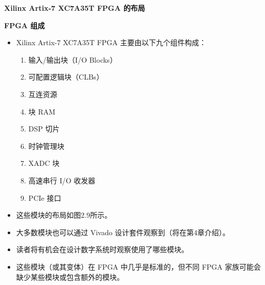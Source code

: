 \documentclass[
  ignorenonframetext,
  chinese,
]{beamer}
\providecommand{\tightlist}{%
  \setlength{\itemsep}{0pt}\setlength{\parskip}{0pt}}
\begin{document}
\begin{frame}
\begin{block}{\textbf{Xilinx Artix-7 XC7A35T FPGA 的布局}}
\label{xilinx-artix-7-xc7a35t-fpga-ux7684ux5e03ux5c40}
\begin{block}{\textbf{FPGA 组成}}
\label{fpga-ux7ec4ux6210}
\begin{itemize}
\tightlist
\item
  Xilinx Artix-7 XC7A35T FPGA 主要由以下九个组件构成：

  \begin{enumerate}
  \tightlist
  \item
    输入/输出块（I/O Blocks）
  \item
    可配置逻辑块（CLBs）
  \item
    互连资源
  \item
    块 RAM
  \item
    DSP 切片
  \item
    时钟管理块
  \item
    XADC 块
  \item
    高速串行 I/O 收发器
  \item
    PCIe 接口
  \end{enumerate}
\item
  这些模块的布局如图2.9所示。
\item
  大多数模块也可以通过 Vivado 设计套件观察到（将在第4章介绍）。
\item
  读者将有机会在设计数字系统时观察使用了哪些模块。
\item
  这些模块（或其变体）在 FPGA 中几乎是标准的，但不同 FPGA
  家族可能会缺少某些模块或包含额外的模块。
\end{itemize}


\end{block}
\end{block}
\end{frame}
\end{document}
